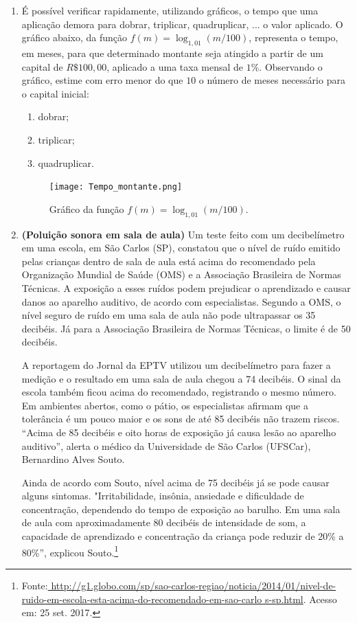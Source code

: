 \exercise
\begin{enumerate}
\item 
É possível verificar rapidamente, utilizando gráficos, o tempo que uma aplicação demora para dobrar, triplicar, quadruplicar, ... o valor aplicado. O gráfico abaixo, da função $f(m)=\log_{1{,}01}(m/100)$, representa o tempo, em meses, para que determinado montante seja atingido a partir de um capital de $R\$ 100{,}00$, aplicado a uma taxa mensal de $1\%$.  Observando o gráfico, estime com erro menor do que $10$ o número de meses necessário para o capital inicial:
\begin{enumerate}
\item dobrar;
\item triplicar;
\item quadruplicar.
\end{enumerate}

\begin{figure}[H]
\centering

\texttt{[image: Tempo\_montante.png]}
\caption{Gráfico da função $f(m)=\log_{1{,}01} (m/100)$.}
\label{EstimaGraf}
\end{figure}



\item {}\label{poluicaoSonora}

\textbf{(Poluição sonora em sala de aula)} Um teste feito com um decibelímetro em uma escola, em São Carlos (SP), 
constatou que o nível de ruído emitido pelas crianças dentro de sala de aula está acima do recomendado pela Organização 
Mundial de Saúde  (OMS) e a Associação Brasileira de Normas Técnicas. A exposição a esses ruídos podem prejudicar o 
aprendizado e causar danos ao aparelho auditivo, de acordo com especialistas.
Segundo a OMS, o nível seguro de ruído em uma sala de aula não pode ultrapassar os 35 decibéis. Já para a Associação Brasileira de Normas Técnicas, o limite é de 50 decibéis.

A reportagem do Jornal da EPTV utilizou um decibelímetro para fazer a medição e o resultado em uma sala de aula chegou a 74 decibéis. O sinal da escola também ficou acima do recomendado, registrando o mesmo número. Em ambientes abertos, como o pátio, os especialistas afirmam que a tolerância é um pouco maior e os sons de até 85 decibéis não trazem riscos. “Acima de 85 decibéis e oito horas de exposição já causa lesão ao aparelho auditivo”, alerta 
o médico da Universidade de São Carlos (UFSCar), Bernardino Alves Souto.

Ainda de acordo com Souto, nível acima de 75 decibéis já se pode causar alguns sintomas. "Irritabilidade, 
insônia, 
ansiedade e dificuldade de concentração, dependendo do tempo de exposição ao barulho. Em uma sala de aula com 
aproximadamente 80 decibéis de intensidade de som, a capacidade de aprendizado e concentração da criança pode reduzir de 
20{\%} a 80{\%}”, explicou 
Souto.\footnote{Fonte:\url{
http://g1.globo.com/sp/sao-carlos-regiao/noticia/2014/01/nivel-de-ruido-em-escola-esta-acima-do-recomendado-em-sao-carlo
s-sp.html}. Acesso em: 25 set. 2017.}


\end{enumerate}
